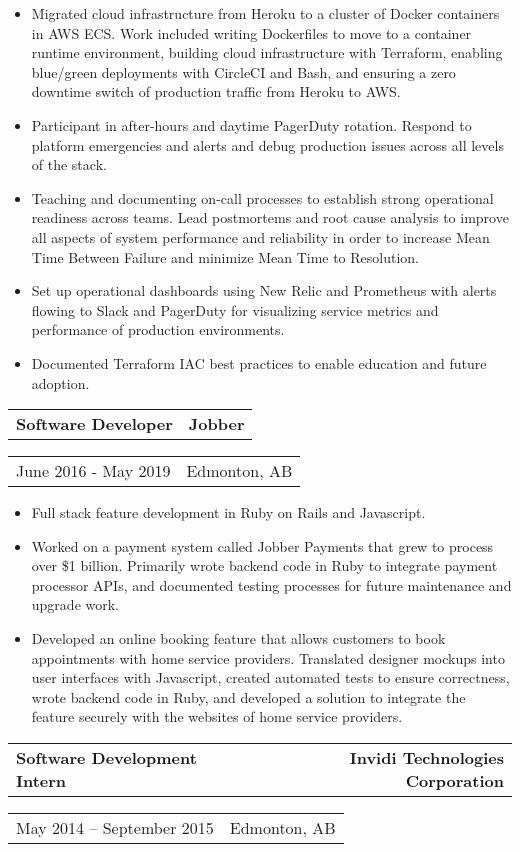 \documentclass[10pt,letterpaper]{article}
\makeatletter
\newcommand{\headerrow}[2]
{\begin{tabular*}{\linewidth}{l@{\extracolsep{\fill}}r}
	#1 &
	#2 \\
\end{tabular*}}
\makeatother
\begin{document}
       \begin{itemize}
          \itemsep0em
                \item Migrated cloud infrastructure from Heroku to a cluster of Docker containers in AWS ECS. Work included writing Dockerfiles to move to a container runtime environment, building cloud infrastructure with Terraform, enabling blue/green deployments with CircleCI and Bash, and ensuring a zero downtime switch of production traffic from Heroku to AWS.
                \item Participant in after-hours and daytime PagerDuty rotation. Respond to platform emergencies and alerts and debug production issues across all levels of the stack.
                \item Teaching and documenting on-call processes to establish strong operational readiness across teams. Lead postmortems and root cause analysis to improve all aspects of system performance and reliability in order to increase Mean Time Between Failure and minimize Mean Time to Resolution.
                \item Set up operational dashboards using New Relic and Prometheus with alerts flowing to Slack and PagerDuty for visualizing service metrics and performance of production environments.
                \item Documented Terraform IAC best practices to enable education and future adoption.
        \end{itemize}
       \headerrow
       	        {\textbf{Software Developer}}
	        {\textbf{Jobber}}
	\headerrow
		{June 2016 - May 2019}
		{Edmonton, AB}

       \begin{itemize}
          \itemsep0em
          	\item Full stack feature development in Ruby on Rails and Javascript.
                \item Worked on a payment system called Jobber Payments that grew to process over \$1 billion. Primarily wrote backend code in Ruby to integrate payment processor APIs, and documented testing processes for future maintenance and upgrade work.
                \item Developed an online booking feature that allows customers to book appointments with home service providers. Translated designer mockups into user interfaces with Javascript, created automated tests to ensure correctness, wrote backend code in Ruby, and developed a solution to integrate the feature securely with the websites of home service providers.
        \end{itemize}	
       \headerrow
                {\textbf{Software Development Intern}}
		{\textbf{Invidi Technologies Corporation}}
       \headerrow
		{May 2014 -- September 2015 }
                {Edmonton, AB}
\end{document}
